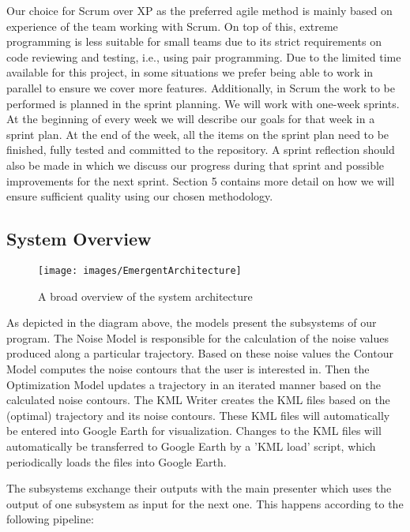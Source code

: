 Our choice for Scrum over XP as the preferred agile method is mainly based on experience of the team working with Scrum. On top of this, extreme programming is less suitable for small teams due to its strict requirements on code reviewing and testing, i.e., using pair programming. Due to the limited time available for this project, in some situations we prefer being able to work in parallel to ensure we cover more features. 
Additionally, in Scrum the work to be performed is planned in the sprint planning. We will work with one-week sprints. At the beginning of every week we will describe our goals for that week in a sprint plan. At the end of the week, all the items on the sprint plan need to be finished, fully tested and committed to the repository. A sprint reflection should also be made in which we discuss our progress during that sprint and possible improvements for the next sprint. Section 5 contains more detail on how we will ensure sufficient quality using our chosen methodology.

\subsection{System Overview}

\begin{figure}[ht]
    \centering
    \label{img:architecure}
    \texttt{[image: images/EmergentArchitecture]}
    \caption{A broad overview of the system architecture}
\end{figure}

As depicted in the diagram above, the models present the subsystems of our program. The Noise Model is responsible for the calculation of the noise values produced along a particular trajectory. Based on these noise values the Contour Model computes the noise contours that the user is interested in. Then
the Optimization Model updates a trajectory in an iterated manner based on the calculated noise contours. The KML Writer creates the KML files based on the (optimal) trajectory and its noise contours. These KML files will automatically be entered into Google Earth for visualization. Changes to the KML files will automatically be transferred to Google Earth by a 'KML load' script, which periodically loads the files into Google Earth.

The subsystems exchange their outputs with the main presenter which uses the output of one subsystem as input for the next one. This happens according to the following pipeline:

